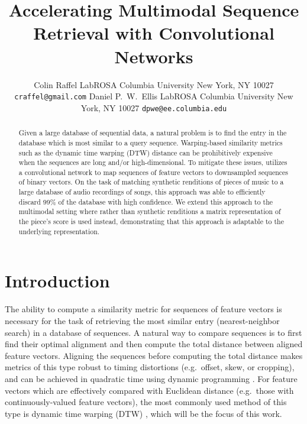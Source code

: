 \documentclass{article} %
\title{Accelerating Multimodal Sequence Retrieval with Convolutional Networks}
\author{
Colin Raffel
LabROSA
Columbia University
New York, NY 10027
\texttt{craffel@gmail.com}
\And
Daniel P.~W.~Ellis
LabROSA
Columbia University
New York, NY 10027
\texttt{dpwe@ee.columbia.edu}
}
\begin{document}
\maketitle

\begin{abstract}
Given a large database of sequential data, a natural problem is to find the entry in the database which is most similar to a query sequence.
Warping-based similarity metrics such as the dynamic time warping (DTW) distance can be prohibitively expensive when the sequences are long and/or high-dimensional.
To mitigate these issues, \cite{raffel2015large} utilizes a convolutional network to map sequences of feature vectors to downsampled sequences of binary vectors.
On the task of matching synthetic renditions of pieces of music to a large database of audio recordings of songs, this approach was able to efficiently discard 99\% of the database with high confidence.
We extend this approach to the multimodal setting where rather than synthetic renditions a matrix representation of the piece's score is used instead, demonstrating that this approach is adaptable to the underlying representation.
\end{abstract}

\section{Introduction}
\label{sec:intro}

The ability to compute a similarity metric for sequences of feature vectors is necessary for the task of retrieving the most similar entry (nearest-neighbor search) in a database of sequences.
A natural way to compare sequences is to first find their optimal alignment and then compute the total distance between aligned feature vectors.
Aligning the sequences before computing the total distance makes metrics of this type robust to timing distortions (e.g.\ offset, skew, or cropping), and can be achieved in quadratic time using dynamic programming \cite{rakthanmanon2012searching}.
For feature vectors which are effectively compared with Euclidean distance (e.g.\ those with continuously-valued feature vectors), the most commonly used method of this type is dynamic time warping (DTW) \cite{sakoe1978dynamic}, which will be the focus of this work.
\end{document}
